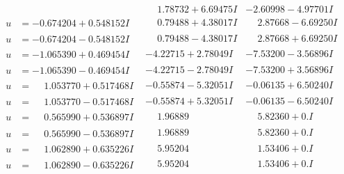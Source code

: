\documentclass[1p]{elsarticle_modified}
\theoremstyle{definition}
\begin{document}
$$\begin{array}{c|c|c}
 & \phantom{-}1.78732 + 6.69475 I & -2.60998 - 4.97701 I \\ \hline\begin{aligned}
u &= -0.674204 + 0.548152 I\end{aligned}
 & \phantom{-}0.79488 + 4.38017 I & \phantom{-}2.87668 - 6.69250 I \\ \hline\begin{aligned}
u &= -0.674204 - 0.548152 I\end{aligned}
 & \phantom{-}0.79488 - 4.38017 I & \phantom{-}2.87668 + 6.69250 I \\ \hline\begin{aligned}
u &= -1.065390 + 0.469454 I\end{aligned}
 & -4.22715 + 2.78049 I & -7.53200 - 3.56896 I \\ \hline\begin{aligned}
u &= -1.065390 - 0.469454 I\end{aligned}
 & -4.22715 - 2.78049 I & -7.53200 + 3.56896 I \\ \hline\begin{aligned}
u &= \phantom{-}1.053770 + 0.517468 I\end{aligned}
 & -0.55874 - 5.32051 I & -0.06135 + 6.50240 I \\ \hline\begin{aligned}
u &= \phantom{-}1.053770 - 0.517468 I\end{aligned}
 & -0.55874 + 5.32051 I & -0.06135 - 6.50240 I \\ \hline\begin{aligned}
u &= \phantom{-}0.565990 + 0.536897 I\end{aligned}
 & \phantom{-}1.96889\phantom{ +0.000000I} & \phantom{-}5.82360 + 0. I\phantom{ +0.000000I} \\ \hline\begin{aligned}
u &= \phantom{-}0.565990 - 0.536897 I\end{aligned}
 & \phantom{-}1.96889\phantom{ +0.000000I} & \phantom{-}5.82360 + 0. I\phantom{ +0.000000I} \\ \hline\begin{aligned}
u &= \phantom{-}1.062890 + 0.635226 I\end{aligned}
 & \phantom{-}5.95204\phantom{ +0.000000I} & \phantom{-}1.53406 + 0. I\phantom{ +0.000000I} \\ \hline\begin{aligned}
u &= \phantom{-}1.062890 - 0.635226 I\end{aligned}
 & \phantom{-}5.95204\phantom{ +0.000000I} & \phantom{-}1.53406 + 0. I\phantom{ +0.000000I}\\

\end{array}$$
\end{document}
